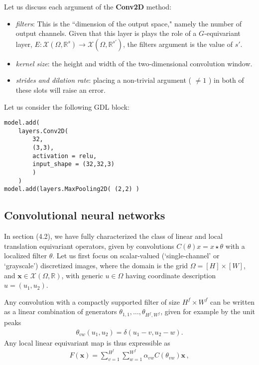 \documentclass[12pt]{article}
\numberwithin{equation}{section}
\theoremstyle{definition}
\newcommand{		\R		}	{	\mathbb{R}				}
\newcommand{		\cX		}	{	\mathcal{X}				}
\newcommand{		\eq		}[1]	{	\begin{align*}#1\end{align*}	}%
\newcommand{		\B		}	{\textbf					} %
\newcommand{		\Oh		}	{	\Omega					}
\newcommand{		\1		}	{	\bm{1}					}%
\begin{document}
Let us discuss each argument of the \B{Conv2D} method:

\begin{itemize}
\item \emph{filters}: This is the ``dimension of the output space," namely the number of output channels. Given that this layer is plays the role of a $G$-equivariant layer, $E : \cX(\Oh, \R^s) \to \cX(\Oh, \R^{s'})$, the filters argument is the value of $s'$.  
\item \emph{kernel size}: the height and width of the two-dimensional convolution window. 
\item \emph{strides and dilation rate}: placing a non-trivial argument ( $\neq 1$ ) in both of these slots will raise an error. 
\end{itemize}

Let us consider the following GDL block: 

\vspace{5mm}

\begin{mdframed}
\begin{verbatim}
model.add( 
	layers.Conv2D( 
		32, 
		(3,3), 
		activation = relu, 
		input_shape = (32,32,3) 
		) 
	)
model.add(layers.MaxPooling2D( (2,2) ) 
\end{verbatim}
\end{mdframed}

\subsection{Convolutional neural networks} 

In section (4.2), we have fully characterized the class of linear and local translation equivariant operators, given by convolutions $C(\theta) x = x \star \theta$ with a localized filter $\theta$. Let us first focus on scalar-valued (`single-channel' or `grayscale') discretized images, where the domain is the grid $\Oh = [H] \times [W ]$, and $\mathbf{x} \in \cX(\Oh,\R)$, with generic $u \in \Oh$ having coordinate description $u = (u_1, u_2)$. 

Any convolution with a compactly supported filter of size $H^f \times W^f$ can be written as a linear combination of generators $\theta_{1,1}, \dots, \theta_{H^f, W^f}$, given for example by the unit peaks
\eq{
\theta_{vw} (u_1, u_2) = \delta(u_1 - v, u_2 - w) .
}
Any local linear equivariant map is thus expressible as
\eq{
F(\mathbf{x}) = \sum_{v=1}^{H^f} \sum_{w = 1}^{W^f} \alpha_{vw} C(\theta_{vw} ) \mathbf{x} \,, 
}
\end{document}
